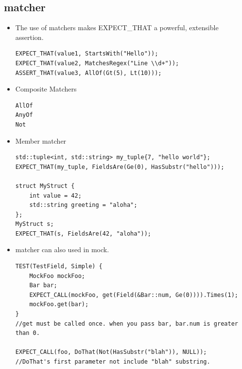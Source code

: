 \documentclass[a4paper,11pt,twoside]{book}
\begin{document}
\subsection{matcher}
\begin{itemize}


\item The use of matchers makes EXPECT\_THAT a powerful, extensible assertion.
\begin{lstlisting}
EXPECT_THAT(value1, StartsWith("Hello"));
EXPECT_THAT(value2, MatchesRegex("Line \\d+"));
ASSERT_THAT(value3, AllOf(Gt(5), Lt(10)));
\end{lstlisting}
\item Composite Matchers
\begin{lstlisting}
AllOf
AnyOf
Not
\end{lstlisting}

\item Member matcher
\begin{lstlisting}
std::tuple<int, std::string> my_tuple{7, "hello world"};
EXPECT_THAT(my_tuple, FieldsAre(Ge(0), HasSubstr("hello")));

struct MyStruct {
	int value = 42;
	std::string greeting = "aloha";
};
MyStruct s;
EXPECT_THAT(s, FieldsAre(42, "aloha"));	
\end{lstlisting}

\item matcher can also used in mock. 

\begin{lstlisting}
TEST(TestField, Simple) {
	MockFoo mockFoo;
	Bar bar;
	EXPECT_CALL(mockFoo, get(Field(&Bar::num, Ge(0)))).Times(1);
	mockFoo.get(bar);
}
//get must be called once. when you pass bar, bar.num is greater than 0. 

EXPECT_CALL(foo, DoThat(Not(HasSubstr("blah")), NULL));
//DoThat's first parameter not include "blah" substring.
\end{lstlisting}

\end{itemize}
\end{document}
